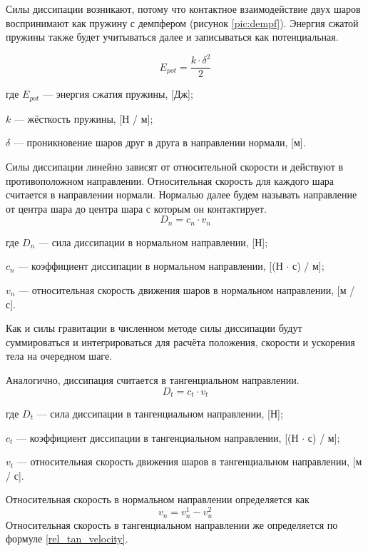 \documentclass[a4paper]{article}
\begin{document}
Силы диссипации возникают, потому что контактное взаимодействие двух шаров воспринимают как пружину с демпфером (рисунок \ref{pic:dempf}). 
Энергия сжатой пружины также будет учитываться далее и записываться как потенциальная.

\[
E_{pot} = \dfrac{k \cdot \delta^2}{2}
\]

где $E_{pot}$ --- энергия сжатия пружины, [Дж];

$k$ --- жёсткость пружины, [Н / м];

$\delta$ --- проникновение шаров друг в друга в направлении нормали, [м].

Силы диссипации линейно зависят от относительной скорости и действуют в противоположном направлении.
Относительная скорость для каждого шара считается в направлении нормали.
Нормалью  далее будем называть направление от центра шара до центра шара с которым он контактирует.
\begin{equation}
\label{dempf_force}
D_n = c_n \cdot v_n
\end{equation}

где $D_n$ --- сила диссипации в нормальном направлении, [Н];

$c_n$ --- коэффициент диссипации в нормальном направлении, [(Н $\cdot$ с) / м];

$v_n$ --- относительная скорость движения шаров в нормальном направлении, [м / с].

Как и силы гравитации в численном методе силы диссипации будут суммироваться и интегрироваться для расчёта положения, скорости и ускорения тела на очередном шаге.

Аналогично, диссипация считается в тангенциальном направлении.
\begin{equation}
\label{dempf_force_tangent}
D_t = c_t \cdot v_t
\end{equation}

где $D_t$ --- сила диссипации в тангенциальном направлении, [Н];

$c_t$ --- коэффициент диссипации в тангенциальном направлении, [(Н $\cdot$ с) / м];

$v_t$ --- относительная скорость движения шаров в тангенциальном направлении, [м / с].

Относительная скорость в нормальном направлении определяется как
\begin{equation}
v_n = v_n^1 - v_n^2
\end{equation}
Относительная скорость в тангенциальном направлении же определяется по формуле \ref{rel_tan_velocity}.
\end{document}
